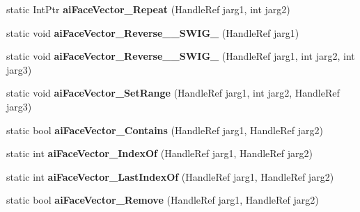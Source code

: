\begin{DoxyCompactItemize}
\item 
\hypertarget{class_assimp_p_i_n_v_o_k_e_af725a1727d14b822a4a4b4df59b54e5a}{static Int\+Ptr {\bfseries ai\+Face\+Vector\+\_\+\+Repeat} (Handle\+Ref jarg1, int jarg2)}\label{class_assimp_p_i_n_v_o_k_e_af725a1727d14b822a4a4b4df59b54e5a}

\item 
\hypertarget{class_assimp_p_i_n_v_o_k_e_ad1f00f8c6355a21c8a2a910a04cf0419}{static void {\bfseries ai\+Face\+Vector\+\_\+\+Reverse\+\_\+\+\_\+\+S\+W\+I\+G\+\_} (Handle\+Ref jarg1)}\label{class_assimp_p_i_n_v_o_k_e_ad1f00f8c6355a21c8a2a910a04cf0419}

\item 
\hypertarget{class_assimp_p_i_n_v_o_k_e_a392a698fa441d98af8fac95fdc5b537a}{static void {\bfseries ai\+Face\+Vector\+\_\+\+Reverse\+\_\+\+\_\+\+S\+W\+I\+G\+\_} (Handle\+Ref jarg1, int jarg2, int jarg3)}\label{class_assimp_p_i_n_v_o_k_e_a392a698fa441d98af8fac95fdc5b537a}

\item 
\hypertarget{class_assimp_p_i_n_v_o_k_e_a4c97f44c7771c176d377db56a1587a11}{static void {\bfseries ai\+Face\+Vector\+\_\+\+Set\+Range} (Handle\+Ref jarg1, int jarg2, Handle\+Ref jarg3)}\label{class_assimp_p_i_n_v_o_k_e_a4c97f44c7771c176d377db56a1587a11}

\item 
\hypertarget{class_assimp_p_i_n_v_o_k_e_a4afd7477396f9c3378ee6417fc7cefc1}{static bool {\bfseries ai\+Face\+Vector\+\_\+\+Contains} (Handle\+Ref jarg1, Handle\+Ref jarg2)}\label{class_assimp_p_i_n_v_o_k_e_a4afd7477396f9c3378ee6417fc7cefc1}

\item 
\hypertarget{class_assimp_p_i_n_v_o_k_e_a154454163dadbf1d9d51b260d904743a}{static int {\bfseries ai\+Face\+Vector\+\_\+\+Index\+Of} (Handle\+Ref jarg1, Handle\+Ref jarg2)}\label{class_assimp_p_i_n_v_o_k_e_a154454163dadbf1d9d51b260d904743a}

\item 
\hypertarget{class_assimp_p_i_n_v_o_k_e_a87cf23eb4386b01b9dc75465e61cd15f}{static int {\bfseries ai\+Face\+Vector\+\_\+\+Last\+Index\+Of} (Handle\+Ref jarg1, Handle\+Ref jarg2)}\label{class_assimp_p_i_n_v_o_k_e_a87cf23eb4386b01b9dc75465e61cd15f}

\item 
\hypertarget{class_assimp_p_i_n_v_o_k_e_adb886053806517408d04352edddf11f2}{static bool {\bfseries ai\+Face\+Vector\+\_\+\+Remove} (Handle\+Ref jarg1, Handle\+Ref jarg2)}\label{class_assimp_p_i_n_v_o_k_e_adb886053806517408d04352edddf11f2}


\end{DoxyCompactItemize}
